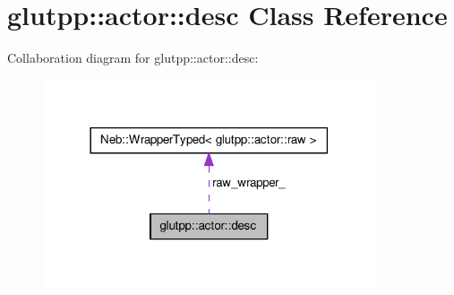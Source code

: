 \hypertarget{classglutpp_1_1actor_1_1desc}{\section{glutpp\-:\-:actor\-:\-:desc \-Class \-Reference}
\label{classglutpp_1_1actor_1_1desc}
}


\-Collaboration diagram for glutpp\-:\-:actor\-:\-:desc\-:\nopagebreak
\begin{figure}[H]
\begin{center}
\leavevmode
\includegraphics[width=278pt]{classglutpp_1_1actor_1_1desc__coll__graph}
\end{center}
\end{figure}
